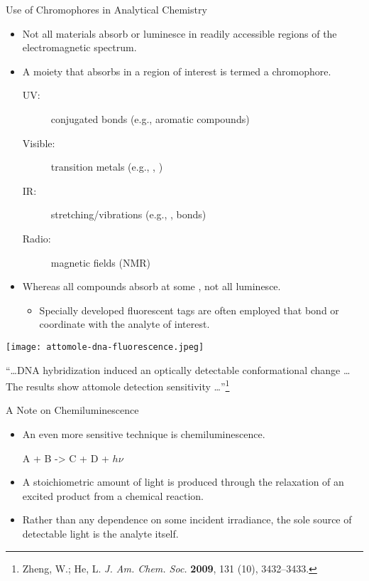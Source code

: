 \documentclass[notes=show]{beamer}
\begin{document}
\begin{frame}[allowframebreaks]{Use of Chromophores in Analytical Chemistry}
	\begin{itemize}
		\item Not all materials absorb or luminesce in readily
			accessible regions of the electromagnetic spectrum.
		\item A \alert{moiety} that absorbs in a region of interest is
			termed a \alert{chromophore}.
			\begin{description}
				\item[UV:] conjugated \textpi{} bonds (e.g., aromatic
				compounds)
			\item[Visible:] transition metals (e.g., ,
				)
			\item[IR:] stretching/vibrations (e.g., ,
				 \textsigma{} bonds)
			\item[Radio:] magnetic fields (NMR)
			\end{description}
		\item Whereas all compounds absorb at some \textlambda, not all
			luminesce.
			\begin{itemize}
				\item Specially developed \alert{fluorescent
					tags} are often employed that bond or
					coordinate with the analyte of interest.
			\end{itemize}
	\end{itemize}

	\framebreak

	\begin{center}
		\texttt{[image: attomole-dna-fluorescence.jpeg]}
	\end{center}

	{\footnotesize
	``\ldots DNA hybridization induced an optically detectable
	conformational change \ldots %
	The results show \alert{attomole detection
	sensitivity} \ldots''\footnote{Zheng, W.; He, L. \textit{J. Am. Chem.
	Soc.} \textbf{2009}, 131 (10), 3432–3433.}}
\end{frame}


\begin{frame}{A Note on Chemiluminescence}
	\begin{itemize}
		\item An even more sensitive technique is
			\alert{chemiluminescence}.

			\begin{reaction*}
				A + B -> C + D + $h\nu$
			\end{reaction*}

		\item A \alert{stoichiometric} amount of light is produced
			through the relaxation of an excited product from a
			chemical reaction.
		\item Rather than any dependence on some incident irradiance,
			the sole source of detectable light is the analyte
			itself.
	\end{itemize}
\end{frame}
\end{document}
